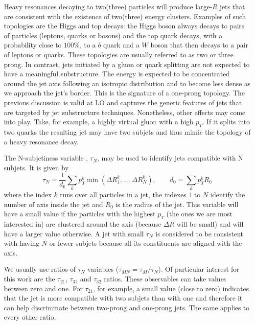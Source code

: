 Heavy resonances decaying to two(three) particles will produce large-$R$ jets that are consistent with the existence of two(three) energy clusters. Examples of such topologies are the Higgs and top decays: the Higgs boson always decays to pairs of particles (leptons, quarks or bosons) and the top quark decays, with a probability close to $100\%$, to a $b$ quark and a $W$ boson that then decays to a pair of leptons or quarks. These topologies are usually referred to as two or three prong. In contrast, jets initiated by a gluon or quark splitting are not expected to have a meaningful substructure. The energy is expected to be concentrated around the jet axis following an isotropic distribution and to become less dense as we approach the jet's border. This is the signature of a one-prong topology. The previous discussion is valid at LO and captures the generic features of jets that are targeted by jet substructure techniques. Nonetheless, other effects may come into play. Take, for example, a highly virtual gluon with a high $p_T$. If it splits into two quarks the resulting jet may have two subjets and thus mimic the topology of a heavy resonance decay.

The N-subjetiness variable \cite{Nsubjetiness}, $\tau_N$, may be used to identify jets compatible with N subjets. It is given by 
\begin{equation}
	\tau_N = \frac{1}{d_0}\sum_{k}p_T^k \min(\Delta R_1^k,...,\Delta R_N^k), \qquad d_0=\sum_{k}p_T^k R_0
\end{equation}
where the index $k$ runs over all particles in a jet, the indexes $1$ to $N$ identify the number of axis inside the jet and $R_0$ is the radius of the jet. This variable will have a small value if the particles with the highest $p_T$ (the ones we are most interested in) are clustered around the axis (because $\Delta R$ will be small) and will have a larger value otherwise. A jet with small $\tau_N$ is considered to be consistent with having $N$ or fewer subjets because all its constituents are aligned with the axis.

We usually use ratios of $\tau_N$ variables ($\tau_{MN}=\tau_M/\tau_N$). Of particular interest for this work are the $\tau_{21}$, $\tau_{31}$ and $\tau_{32}$ ratios. These observables can take values between zero and one. For $\tau_{21}$, for example, a small value (close to zero) indicates that the jet is more compatible with two subjets than with one and therefore it can help discriminate between two-prong and one-prong jets. The same applies to every other ratio. 

